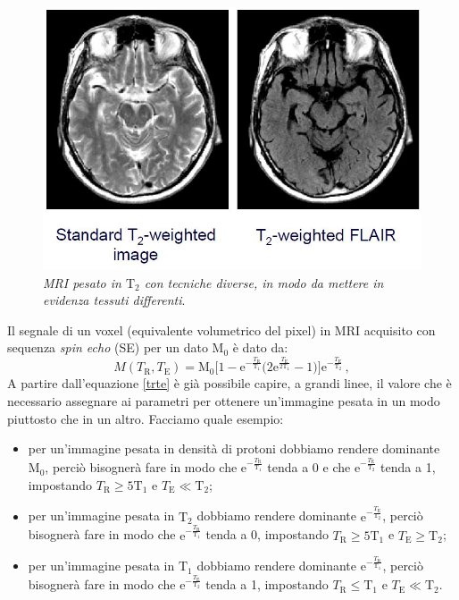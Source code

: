 \documentclass{report}
\renewcommand{\eqref}[1]{equazione \ref{#1}}
\numberwithin{equation}{section}
\numberwithin{figure}{section}
\begin{document}
\begin{figure}[htp]
\centering
\includegraphics[scale=0.4]{immagini/flair.png}
\caption{\label{fig:flair} \textit{MRI pesato in $\mathrm{T_2}$ con tecniche diverse, in modo da mettere in evidenza tessuti differenti}.}
\end{figure}

Il segnale di un voxel (equivalente volumetrico del pixel) in MRI acquisito con sequenza \textit{spin echo} (SE) per un dato $\mathrm{M}_0$ è dato da:
\begin{equation}
    M(T_\mathrm{R},T_\mathrm{E})= \mathrm{M}_0 \Big[1-\mathrm{e}^{-\frac{T_\mathrm{R}}{\mathrm{T_1}}} \Big(2\mathrm{e}^{\frac{T_\mathrm{E}}{2\mathrm{T_1}}}-1 \Big) \Big]\mathrm{e}^{-\frac{T_\mathrm{E}}{\mathrm{T_2}}}\,,
    \label{trte}
\end{equation}
A partire dall'\eqref{trte} è già possibile capire, a grandi linee, il valore che è necessario assegnare ai parametri per ottenere un'immagine pesata in un modo piuttosto che in un altro. Facciamo quale esempio:
\begin{itemize}[label=$-$]
    \item per un'immagine pesata in densità di protoni dobbiamo rendere dominante $\mathrm{M_0}$, perciò bisognerà fare in modo che $\mathrm{e}^{-\frac{T_\mathrm{R}}{\mathrm{T_1}}}$ tenda a 0 e che $\mathrm{e}^{-\frac{T_\mathrm{E}}{\mathrm{T_2}}}$ tenda a 1, impostando $T_\mathrm{R} \geq 5\mathrm{T_1}$ e $T_\mathrm{E} \ll \mathrm{T_2}$;
    \item per un'immagine pesata in $\mathrm{T_2}$ dobbiamo rendere dominante $\mathrm{e}^{-\frac{T_\mathrm{E}}{\mathrm{T_2}}}$, perciò bisognerà fare in modo che $\mathrm{e}^{-\frac{T_\mathrm{R}}{\mathrm{T_1}}}$ tenda a 0, impostando $T_\mathrm{R} \geq 5\mathrm{T_1}$ e $T_\mathrm{E} \geq \mathrm{T_2}$;
    \item per un'immagine pesata in $\mathrm{T_1}$ dobbiamo rendere dominante $\mathrm{e}^{-\frac{T_\mathrm{R}}{\mathrm{T_1}}}$, perciò bisognerà fare in modo che $\mathrm{e}^{-\frac{T_\mathrm{E}}{\mathrm{T_2}}}$ tenda a 1, impostando $T_\mathrm{R} \leq \mathrm{T_1}$ e $T_\mathrm{E} \ll \mathrm{T_2}$.
\end{itemize}
\end{document}
